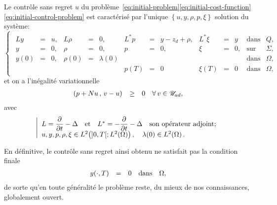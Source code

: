 \begin{theoreme}%
    Le contrôle sans regret $u$ du
    problème~\eqref{eq:initial-problem}\eqref{eq:initial-cost-function}\eqref{eq:initial-control-problem}
    est caractérisé par l'unique $\left\{{u,y,\rho,p,\xi}\right\}$ solution
    du système:
    \begin{equation}
        \begin{cases}\displaystyle
            \begin{array}{rclrclrclrclll}
                Ly & = & u, & L\rho & = & 0, & L^{*}p & = & y - z_{d} +
                \rho, & L^{*}\xi & = & y & \text{dans} & Q,\\
                y & = & 0, & \rho & = & 0, & p & = & 0, & \xi & = & 0, &
                \text{sur} & \Sigma,\\
                y(0) & = & 0, & \rho(0) & = & \lambda(0) & {} & {} & {} &
                {} & {} & {} & \text{dans} & \Omega,\\
                {} & {} & {} & {} & {} & {} & p(T) & = & 0 & \xi(T) & = & 0
                & \text{dans} & \Omega,
            \end{array}
        \end{cases}
    \end{equation}
    et on a l'inégalité variationnelle
    \begin{equation}
        \begin{array}{rcll}
            {\left({ p + Nu\,,\,v - u }\right)}_{} & \geq & 0 & \forall\,v\in{\mathscr{U}}_{ad},
        \end{array}
    \end{equation}
    avec
    \begin{equation*}
        \left|{%
            \begin{array}{l}
                L = \primetemps{} - \Delta\quad\text{et}\quad L^{*} =
                -\primetemps{} - \Delta\quad\text{son opérateur adjoint};\\
                u, y, p, \rho, \xi\in \Ldeux{]0,T[;\Ldeux{\Omega}},\quad
                \lambda(0)\in\Ldeux{\Omega}.
            \end{array}
        }\right.
    \end{equation*}
\end{theoreme}

En définitive, le contrôle sans regret ainsi obtenu ne satisfait pas la
condition finale
\begin{equation*}
    \begin{array}{rclll}
        {y}\!\left({\cdot,T}\right) & = & 0 & \text{dans} & \Omega,
    \end{array}
\end{equation*}
de sorte qu'en toute généralité le problème reste, du mieux de nos
connaissances, globalement ouvert.

